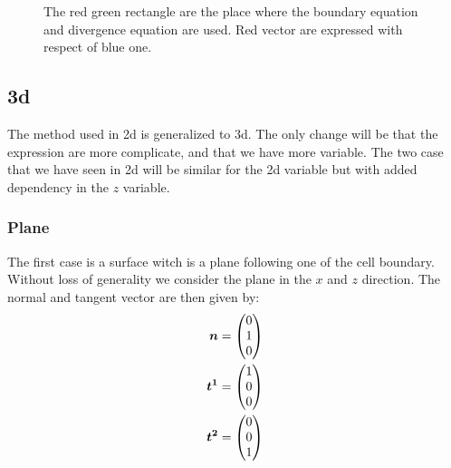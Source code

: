 \begin{figure}
\caption{The red green rectangle are the place where the boundary equation and divergence equation are used.
Red vector are expressed with respect of blue one.}
\label{topology:extrap:plane_45}
\end{figure}

\subsection{3d}
The method used in 2d is generalized to 3d. The only change will be that the expression are more complicate, and that we have more variable.
The two case that we have seen in 2d will be similar for the 2d variable but with added dependency in the $z$ variable.

\subsubsection{Plane}

The first case is a surface witch is a plane following one of the cell boundary.
Without loss of generality we consider the plane in the $x$ and $z$ direction.
The normal and tangent vector are then given by:
\begin{align}
	{\boldsymbol {n}}&=\begin{pmatrix}
			0\\
			1\\
			0
		\end{pmatrix}\\
	{\boldsymbol {t^1}}&=\begin{pmatrix}
			1\\
			0\\
			0
		\end{pmatrix}\\
		{\boldsymbol {t^2}}&=\begin{pmatrix}
			0\\
			0\\
			1
		\end{pmatrix}
\end{align}

